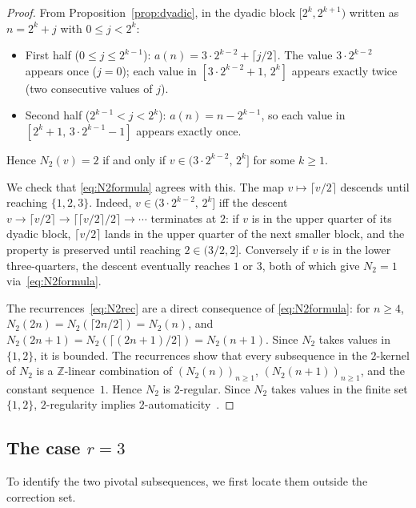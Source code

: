 \documentclass[12pt]{article}
\theoremstyle{definition}
\theoremstyle{remark}
\begin{document}
\begin{proof}
  From Proposition~\ref{prop:dyadic}, in the dyadic block $[2^k, 2^{k+1})$
  written as $n=2^k+j$ with $0\le j<2^k$:
  \begin{itemize}
    \item First half ($0\le j\le 2^{k-1}$): $a(n)=3\cdot 2^{k-2}+\lceil j/2\rceil$.
    The value $3\cdot 2^{k-2}$ appears once ($j=0$); each value in
    $[3\cdot 2^{k-2}+1,\,2^k]$ appears exactly twice (two consecutive values of $j$).
    \item Second half ($2^{k-1}<j<2^k$): $a(n)=n-2^{k-1}$, so
    each value in $[2^k+1,\,3\cdot 2^{k-1}-1]$ appears exactly once.
  \end{itemize}
  Hence $N_2(v)=2$ if and only if $v\in(3\cdot 2^{k-2},\,2^k]$ for some $k\ge 1$.

  We check that \eqref{eq:N2formula} agrees with this. The map
  $v\mapsto\lceil v/2\rceil$ descends until reaching $\{1,2,3\}$.
  Indeed, $v\in(3\cdot 2^{k-2},\,2^k]$ iff the descent
  $v\to\lceil v/2\rceil\to\lceil\lceil v/2\rceil/2\rceil\to\cdots$
  terminates at $2$: if $v$ is in the upper quarter of its dyadic block,
  $\lceil v/2\rceil$ lands in the upper quarter of the next smaller block,
  and the property is preserved until reaching $2\in(3/2,2]$.
  Conversely if $v$ is in the lower three-quarters, the descent
  eventually reaches $1$ or $3$, both of which give $N_2=1$ via~\eqref{eq:N2formula}.

  The recurrences~\eqref{eq:N2rec} are a direct consequence of
  \eqref{eq:N2formula}: for $n\ge 4$,
  $N_2(2n)=N_2(\lceil 2n/2\rceil)=N_2(n)$, and
  $N_2(2n+1)=N_2(\lceil(2n+1)/2\rceil)=N_2(n+1)$.
  Since $N_2$ takes values in $\{1,2\}$, it is bounded.
  The recurrences show that every subsequence in the $2$-kernel of $N_2$
  is a $\mathbb{Z}$-linear combination of
  $(N_2(n))_{n\ge 1}$, $(N_2(n+1))_{n\ge 1}$, and the constant sequence~$1$.
  Hence $N_2$ is $2$-regular. Since $N_2$ takes values in the finite
  set $\{1,2\}$, $2$-regularity implies $2$-automaticity~\cite{AS92}.
\end{proof}

\subsection{The case $r=3$}

To identify the two pivotal subsequences, we first locate them outside the correction set.
\end{document}
